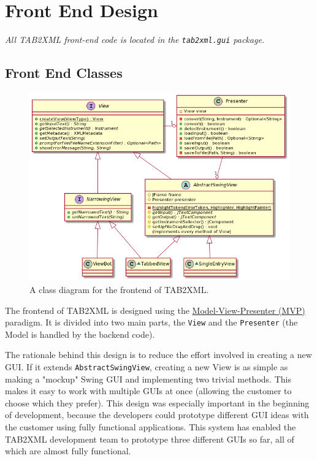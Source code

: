 \documentclass[11pt]{article}
\begin{document}
\section{Front End Design}
\label{sec:org603a449}
\emph{All TAB2XML front-end code is located in the \texttt{tab2xml.gui} package.}
\subsection{Front End Classes}
\label{sec:orga8d6c4c}
\begin{figure}[htbp]
\centering
\includegraphics[width=.9\linewidth]{./Diagrams/frontend-class-diagram.png}
\caption{A class diagram for the frontend of TAB2XML.}
\end{figure}

The frontend of TAB2XML is designed using the \href{https://en.wikipedia.org/wiki/Model\%E2\%80\%93view\%E2\%80\%93presenter}{Model-View-Presenter (MVP)} paradigm.  It is divided into two main parts, the \texttt{View} and the \texttt{Presenter} (the Model is handled by the backend code).

The rationale behind this design is to reduce the effort involved in creating a new GUI.  If it extends \texttt{AbstractSwingView}, creating a new View is as simple as making a "mockup" Swing GUI and implementing two trivial methods.  This makes it easy to work with multiple GUIs at once (allowing the customer to choose which they prefer).  This design was especially important in the beginning of development, because the developers could prototype different GUI ideas with the customer using fully functional applications.  This system has enabled the TAB2XML development team to prototype three different GUIs so far, all of which are almost fully functional.
\end{document}
